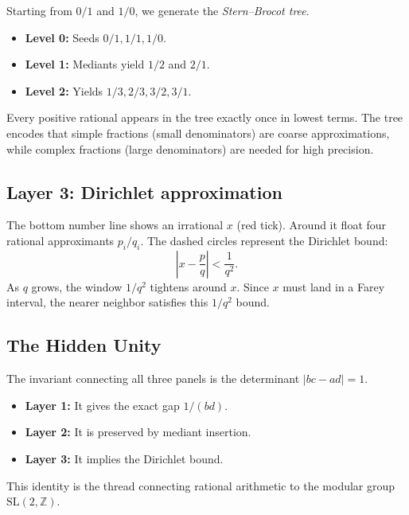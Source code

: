 Starting from $0/1$ and $1/0$, we generate the \emph{Stern--Brocot tree}.
\begin{itemize}
    \item \textbf{Level 0:} Seeds $0/1, 1/1, 1/0$.
    \item \textbf{Level 1:} Mediants yield $1/2$ and $2/1$.
    \item \textbf{Level 2:} Yields $1/3, 2/3, 3/2, 3/1$.
\end{itemize}
Every positive rational appears in the tree exactly once in lowest terms. The tree encodes that simple fractions (small denominators) are coarse approximations, while complex fractions (large denominators) are needed for high precision.

\subsection*{Layer 3: Dirichlet approximation}

The bottom number line shows an irrational $x$ (red tick). Around it float four rational approximants $p_i/q_i$. The dashed circles represent the Dirichlet bound:
\[
\left| x - \frac{p}{q} \right| < \frac{1}{q^2}.
\]
As $q$ grows, the window $1/q^2$ tightens around $x$. Since $x$ must land in a Farey interval, the nearer neighbor satisfies this $1/q^2$ bound.

\subsection*{The Hidden Unity}

The invariant connecting all three panels is the determinant $|bc - ad| = 1$.
\begin{itemize}
    \item \textbf{Layer 1:} It gives the exact gap $1/(bd)$.
    \item \textbf{Layer 2:} It is preserved by mediant insertion.
    \item \textbf{Layer 3:} It implies the Dirichlet bound.
\end{itemize}
This identity is the thread connecting rational arithmetic to the modular group $\mathrm{SL}(2,\mathbb{Z})$.